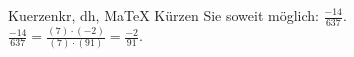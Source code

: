 \begin{MAufgabe}{Kuerzen}{kr, dh, MaTeX}
K\"urzen Sie soweit m\"oglich: $\frac{-14}{637}$.\\ 
\ifLsg\MLoesung
\quad $\frac{-14}{637}=\frac{(7)\cdot(-2)}{(7)\cdot(91)}=\frac{-2}{91}$.\else\relax\fi
 \end{MAufgabe}